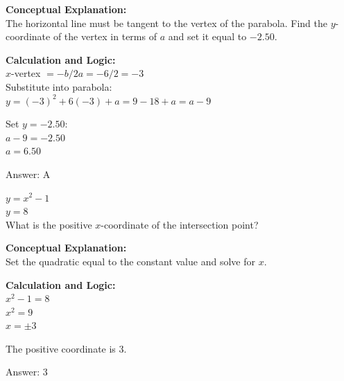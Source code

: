 \documentclass[11pt,paper=a4,answers]{exam}
\begin{document}
\begin{questions}
\begin{solution}
\textbf{Conceptual Explanation:} \\
The horizontal line must be tangent to the vertex of the parabola. Find the $y$-coordinate of the vertex in terms of $a$ and set it equal to $-2.50$.

\vspace{20pt}

\textbf{Calculation and Logic:} \\
$x$-vertex $= -b/2a = -6/2 = -3$ \\
Substitute into parabola: \\
$y = (-3)^2 + 6(-3) + a = 9 - 18 + a = a - 9$

\vspace{10pt}

Set $y = -2.50$: \\
$a - 9 = -2.50$ \\
$a = 6.50$

\vspace{25pt}

Answer: \colorbox{yellow!100}{A}
\end{solution}

\vspace{40pt}

\question
$y = x^2 - 1$ \\
$y = 8$ \\
What is the positive $x$-coordinate of the intersection point?

\begin{solution}
\textbf{Conceptual Explanation:} \\
Set the quadratic equal to the constant value and solve for $x$.

\vspace{20pt}

\textbf{Calculation and Logic:} \\
$x^2 - 1 = 8$ \\
$x^2 = 9$ \\
$x = \pm 3$

\vspace{10pt}

The positive coordinate is 3.

\vspace{25pt}

Answer: \colorbox{yellow!100}{3}
\end{solution}

\vspace{40pt}


\end{questions}
\end{document}
